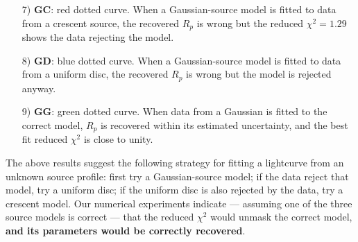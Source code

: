 \begin{enumerate}

\item[7) {\bf GC}:] red dotted curve.  When a Gaussian-source model is
  fitted to data from a crescent source, the recovered $R_p$ is wrong
  but the reduced $\chi^2=1.29$ shows the data rejecting the model.

\item[8) {\bf GD}:] blue dotted curve.  When a Gaussian-source model
  is fitted to data from a uniform disc, the recovered $R_p$ is wrong
  but the model is rejected anyway.

\item[9) {\bf GG}:] green dotted curve.  When data from a Gaussian is
  fitted to the correct model, $R_p$ is recovered within its estimated
  uncertainty, and the best fit reduced $\chi^2$ is close to unity.

\end{enumerate}

The above results suggest the following strategy for fitting a
lightcurve from an unknown source profile: first try a Gaussian-source
model; if the data reject that model, try a uniform disc; if the
uniform disc is also rejected by the data, try a crescent model.  Our
numerical experiments indicate --- assuming one of the three source
models is correct --- that the reduced $\chi^2$ would unmask the
correct model, \textbf{and its parameters would be correctly recovered}.

